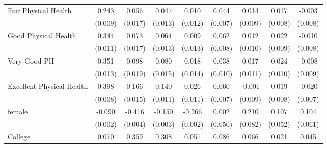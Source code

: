\documentclass[border=3mm,preview]{standalone}
\begin{document}
\begin{landscape}
\begin{table}
\begin{tabular}{l*{8}{c}}
\midrule
Fair Physical Health&       0.243\sym{***}&       0.056\sym{**} &       0.047\sym{***}&       0.010         &       0.044\sym{***}&       0.014         &       0.017\sym{*}  &      -0.003         \\
                    &     (0.009)         &     (0.017)         &     (0.013)         &     (0.012)         &     (0.007)         &     (0.009)         &     (0.008)         &     (0.008)         \\
Good Physical Health&       0.344\sym{***}&       0.073\sym{***}&       0.064\sym{***}&       0.009         &       0.062\sym{***}&       0.012         &       0.022\sym{*}  &      -0.010         \\
                    &     (0.011)         &     (0.017)         &     (0.013)         &     (0.013)         &     (0.008)         &     (0.010)         &     (0.009)         &     (0.008)         \\
Very Good PH        &       0.351\sym{***}&       0.098\sym{***}&       0.080\sym{***}&       0.018         &       0.038\sym{***}&       0.017         &       0.024\sym{*}  &      -0.008         \\
                    &     (0.013)         &     (0.019)         &     (0.015)         &     (0.014)         &     (0.010)         &     (0.011)         &     (0.010)         &     (0.009)         \\
Excellent Physical Health&       0.398\sym{***}&       0.166\sym{***}&       0.140\sym{***}&       0.026\sym{*}  &       0.060\sym{***}&      -0.001         &       0.019\sym{*}  &      -0.020\sym{**} \\
                    &     (0.008)         &     (0.015)         &     (0.011)         &     (0.011)         &     (0.007)         &     (0.009)         &     (0.008)         &     (0.007)         \\
\midrule
female              &      -0.090\sym{***}&      -0.416\sym{***}&      -0.150\sym{***}&      -0.266\sym{***}&       0.002         &       0.210\sym{*}  &       0.107\sym{*}  &       0.104         \\
                    &     (0.002)         &     (0.004)         &     (0.003)         &     (0.002)         &     (0.050)         &     (0.082)         &     (0.052)         &     (0.061)         \\
College             &       0.070\sym{***}&       0.359\sym{***}&       0.308\sym{***}&       0.051\sym{***}&       0.086\sym{***}&       0.066\sym{**} &       0.021         &       0.045\sym{**} \\

\end{tabular}
\end{table}
\end{landscape}
\end{document}
